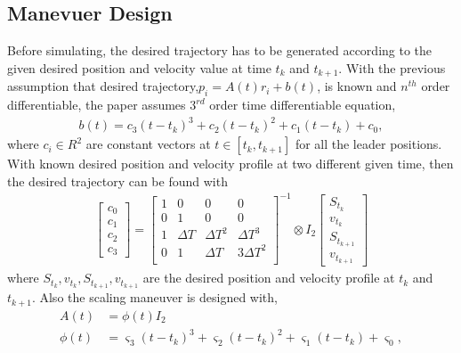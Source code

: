 \subsection{Manevuer Design} \label{Manevuer Design}
 Before simulating, the desired trajectory has to be generated according to the given desired position and velocity value at time $t_k$ and $t_{k+1}$. With the previous assumption that desired trajectory,$p_i = A(t) r_i + b(t)$, is known and $n^{th}$ order differentiable, the paper assumes $3^{rd}$ order time differentiable equation, 
 \begin{align*}
    b(t) = c_3(t-t_k)^3 + c_2 (t-t_k)^2  + c_1 (t-t_k) + c_0,
 \end{align*}
 where $c_i \in R^{2}$ are constant vectors at $t \in [t_k, t_{k+1}]$ for all the leader positions. With known desired position and velocity profile at two different given time, then the desired trajectory can be found with 
 \begin{align*}
    \begin{bmatrix}
        c_0\\c_1\\c_2\\c_3
    \end{bmatrix}
    = \begin{bmatrix}
        1 & 0 & 0 & 0 \\
        0 & 1 & 0 & 0 \\
        1 & \Delta T & \Delta T ^2 & \Delta T^3 \\
        0 & 1 & \Delta T  & 3\Delta T^2 \\
    \end{bmatrix}^{-1}
    \otimes I_2 
    \begin{bmatrix}
        S_{t_k}\\v_{t_k}\\S_{t_{k+1}}\\v_{t_{k+1}}
    \end{bmatrix}
 \end{align*}
 where $S_{t_k},v_{t_k},S_{t_{k+1}},v_{t_{k+1}}$ are the desired position and velocity profile at $t_k$ and $t_{k+1}$.
 Also the scaling maneuver is designed with, 
 \begin{align*}
    A(t) &= \phi (t) I_2\\
    \phi (t) &=  \varsigma_3(t-t_k)^3 + \varsigma_2 (t-t_k)^2  + \varsigma_1 (t-t_k) + \varsigma_0,
 \end{align*}
